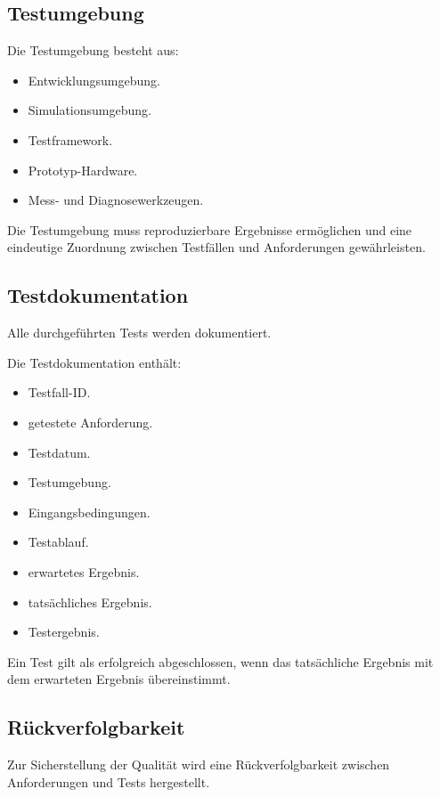 \subsection{Testumgebung}\label{testumgebung}

Die Testumgebung besteht aus:

\begin{itemize}
\tightlist
\item
  Entwicklungsumgebung.
\item
  Simulationsumgebung.
\item
  Testframework.
\item
  Prototyp-Hardware.
\item
  Mess- und Diagnosewerkzeugen.
\end{itemize}

Die Testumgebung muss reproduzierbare Ergebnisse ermöglichen und eine
eindeutige Zuordnung zwischen Testfällen und Anforderungen
gewährleisten.

\subsection{Testdokumentation}\label{testdokumentation}

Alle durchgeführten Tests werden dokumentiert.

Die Testdokumentation enthält:

\begin{itemize}
\tightlist
\item
  Testfall-ID.
\item
  getestete Anforderung.
\item
  Testdatum.
\item
  Testumgebung.
\item
  Eingangsbedingungen.
\item
  Testablauf.
\item
  erwartetes Ergebnis.
\item
  tatsächliches Ergebnis.
\item
  Testergebnis.
\end{itemize}

Ein Test gilt als erfolgreich abgeschlossen, wenn das tatsächliche
Ergebnis mit dem erwarteten Ergebnis übereinstimmt.

\subsection{Rückverfolgbarkeit}\label{ruxfcckverfolgbarkeit}

Zur Sicherstellung der Qualität wird eine Rückverfolgbarkeit zwischen
Anforderungen und Tests hergestellt.

